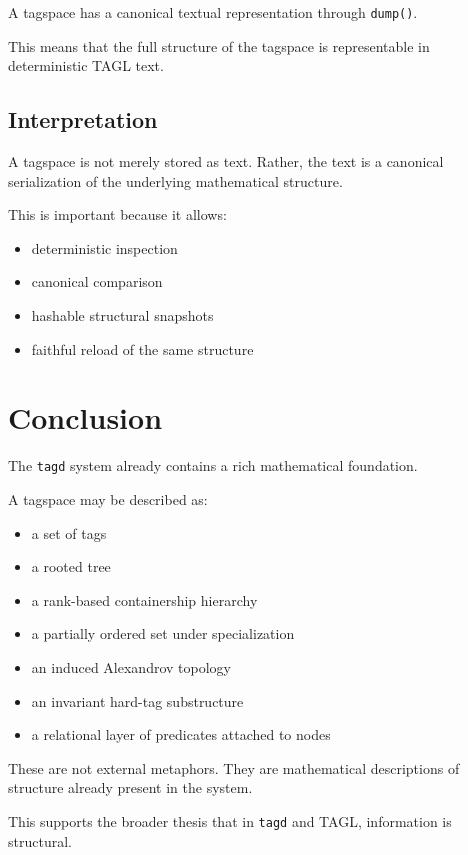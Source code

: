 \documentclass{article}
\begin{document}
A tagspace has a canonical textual representation through \texttt{dump()}.

This means that the full structure of the tagspace is representable in
deterministic TAGL text.

\subsection{Interpretation}

A tagspace is not merely stored as text. Rather, the text is a canonical
serialization of the underlying mathematical structure.

This is important because it allows:

\begin{itemize}
    \item deterministic inspection
    \item canonical comparison
    \item hashable structural snapshots
    \item faithful reload of the same structure
\end{itemize}

\section{Conclusion}

The \texttt{tagd} system already contains a rich mathematical foundation.

A tagspace may be described as:

\begin{itemize}
    \item a set of tags
    \item a rooted tree
    \item a rank-based containership hierarchy
    \item a partially ordered set under specialization
    \item an induced Alexandrov topology
    \item an invariant hard-tag substructure
    \item a relational layer of predicates attached to nodes
\end{itemize}

These are not external metaphors. They are mathematical descriptions of
structure already present in the system.

This supports the broader thesis that in \texttt{tagd} and TAGL,
information is structural.
\end{document}
